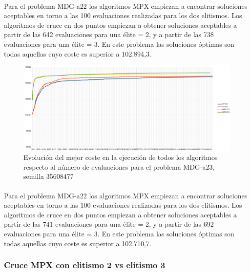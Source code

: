 	\paragraph{}Para el problema MDG-a22 los algoritmos MPX empiezan a encontrar soluciones aceptables en torno a las 100 evaluaciones realizadas para los dos elitismos. Los algoritmos de cruce en dos puntos empiezan a obtener soluciones aceptables a partir de las 642 evaluaciones para una élite = 2, y a partir de las 738 evaluaciones para una élite = 3. En este problema las soluciones óptimas son todas aquellas cuyo coste es superior a 102.894,3.

	\begin{figure}[H]
		\centering
		\includegraphics[scale=0.3]{img/35608477_MDG-a_23_n2000_m200.png}
		\caption{Evolución del mejor coste en la ejecución de todos los algoritmos respecto al número de evaluaciones para el problema MDG-a23, semilla 35608477}
		\label{MDG-a_23_historico}
	\end{figure}

	\paragraph{}Para el problema MDG-a22 los algoritmos MPX empiezan a encontrar soluciones aceptables en torno a las 100 evaluaciones realizadas para los dos elitismos. Los algoritmos de cruce en dos puntos empiezan a obtener soluciones aceptables a partir de las 741 evaluaciones para una élite = 2, y a partir de las 692 evaluaciones para una élite = 3. En este problema las soluciones óptimas son todas aquellas cuyo coste es superior a 102.710,7.
			
	
	\subsubsection{Cruce MPX con elitismo 2 vs elitismo 3}
	
